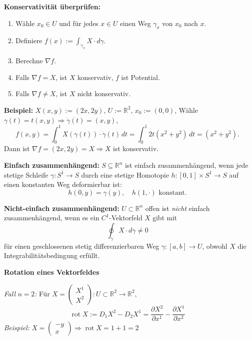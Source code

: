 \textbf{Konservativität überprüfen:}

\begin{enumerate}
  \item Wähle \( x_0 \in U \) und für jedes \( x \in U \) einen Weg \( \gamma_x \) von \( x_0 \) nach \( x \).
  \item Definiere \( f(x) := \int_{\gamma_x} X \cdot d\gamma \).
  \item Berechne \( \nabla f \).
  \item Falls \( \nabla f = X \), ist \( X \) konservativ, \( f \) ist Potential.
  \item Falls \( \nabla f \neq X \), ist \( X \) nicht konservativ.
\end{enumerate}

\textbf{Beispiel:}  
\( X(x, y) := (2x, 2y) \), \( U := \mathbb{R}^2 \), \( x_0 := (0,0) \),  
Wähle \( \gamma(t) = t(x,y) \Rightarrow \dot{\gamma}(t) = (x,y) \),  
\[
f(x, y) = \int_0^1 X(\gamma(t)) \cdot \dot{\gamma}(t)\,dt
= \int_0^1 2t(x^2 + y^2)\,dt = (x^2 + y^2).
\]  
Dann ist \( \nabla f = (2x, 2y) = X \Rightarrow X \) ist konservativ.

\textbf{Einfach zusammenhängend:}  
\( S \subseteq \mathbb{R}^n \) ist einfach zusammenhängend, wenn jede stetige Schleife \( \gamma : S^1 \to S \) durch eine stetige Homotopie \( h : [0,1] \times S^1 \to S \) auf einen konstanten Weg deformierbar ist:
\[
h(0, y) = \gamma(y), \quad h(1, \cdot) \text{ konstant}.
\]

\textbf{Nicht-einfach zusammenhängend:}  
\( U \subset \mathbb{R}^n \) offen ist \emph{nicht} einfach zusammenhängend, wenn es ein \( C^1 \)-Vektorfeld \( X \) gibt mit  
\[
\oint_\gamma X \cdot d\gamma \neq 0
\]
für einen geschlossenen stetig differenzierbaren Weg \( \gamma : [a,b] \to U \), obwohl \( X \) die Integrabilitätsbedingung erfüllt.

\textbf{Rotation eines Vektorfeldes}

\textit{Fall \(n=2\):} Für \( X = \begin{pmatrix} X^1 \\ X^2 \end{pmatrix} : U \subset \mathbb{R}^2 \to \mathbb{R}^2 \),
\[
\operatorname{rot} X := D_1 X^2 - D_2 X^1 = \frac{\partial X^2}{\partial x^1} - \frac{\partial X^1}{\partial x^2}
\]
\textit{Beispiel:} \( X = \begin{pmatrix} -y \\ x \end{pmatrix} \Rightarrow \operatorname{rot} X = 1 + 1 = 2 \)

